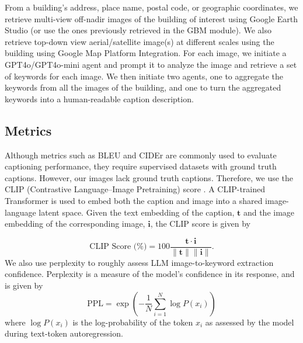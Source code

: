 From a building's address, place name, postal code, or geographic coordinates, we retrieve multi-view off-nadir images of the building of interest using Google Earth Studio (or use the ones previously retrieved in the GBM module). We also retrieve top-down view aerial/satellite image(s) at different scales using the building using Google Map Platform Integration. For each image, we initiate a GPT4o/GPT4o-mini agent and prompt it to analyze the image and retrieve a set of keywords for each image. We then initiate two agents, one to aggregate the keywords from all the images of the building, and one to turn the aggregated keywords into a human-readable caption description. 
















\subsection{Metrics}
Although metrics such as BLEU and CIDEr are commonly used to evaluate captioning performance, they require supervised datasets with ground truth captions. However, our images lack ground truth captions. Therefore, we use the CLIP (Contrastive Language–Image Pretraining) score \cite{clip}. A CLIP-trained Transformer is used to embed both the caption and image into a shared image-language latent space. Given the text embedding of the caption, $\mathbf{t}$ and the image embedding of the corresponding image, $\mathbf{i}$, the CLIP score is given by 

\begin{equation}
\text{CLIP Score (\%)} = 100 \frac{\mathbf{t} \cdot \mathbf{i}}{\|\mathbf{t}\| \|\mathbf{i}\|}.
\end{equation}
We also use perplexity to roughly assess LLM image-to-keyword extraction confidence. Perplexity is a measure of the model's confidence in its response, and is given by
\begin{equation}
\text{PPL} = \exp \left( - \frac{1}{N} \sum_{i=1}^{N} \log P(x_i)\right)
\end{equation}
where $\log P(x_i)$ is the log-probability of the token $x_i$ as assessed by the model during text-token autoregression.